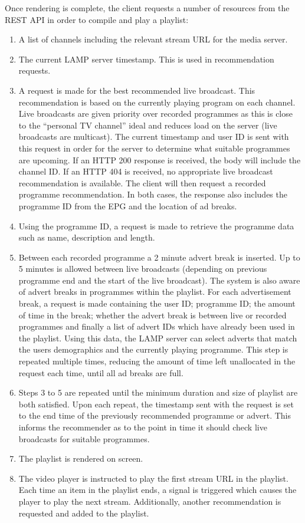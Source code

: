 Once rendering is complete, the client requests a number of resources from the REST API in order to compile and play a playlist:

\begin{enumerate}
	\item A list of channels including the relevant stream URL for the media server.
	\item The current LAMP server timestamp. This is used in recommendation requests.
	\item A request is made for the best recommended live broadcast. This recommendation is based on the currently playing program on each channel. Live broadcasts are given priority over recorded programmes as this is close to the ``personal TV channel'' ideal and reduces load on the server (live broadcasts are multicast). The current timestamp and user ID is sent with this request in order for the server to determine what suitable programmes are upcoming. If an HTTP 200 response is received, the body will include the channel ID. If an HTTP 404 is received, no appropriate live broadcast recommendation is available. The client will then request a recorded programme recommendation. In both cases, the response also includes the programme ID from the EPG and the location of ad breaks.
	\item Using the programme ID, a request is made to retrieve the programme data such as name, description and length.
	\item Between each recorded programme a 2 minute advert break is inserted. Up to 5 minutes is allowed between live broadcasts (depending on previous programme end and the start of the live broadcast). The system is also aware of advert breaks in programmes within the playlist. For each advertisement break, a request is made containing the user ID; programme ID; the amount of time in the break; whether the advert break is between live or recorded programmes and finally a list of advert IDs which have already been used in the playlist. Using this data, the LAMP server can select adverts that match the users demographics and the currently playing programme. This step is repeated multiple times, reducing the amount of time left unallocated in the request each time, until all ad breaks are full.
	\item Steps 3 to 5 are repeated until the minimum duration and size of playlist are both satisfied. Upon each repeat, the timestamp sent with the request is set to the end time of the previously recommended programme or advert. This informs the recommender as to the point in time it should check live broadcasts for suitable programmes.
	\item The playlist is rendered on screen.
	\item The video player is instructed to play the first stream URL in the playlist. Each time an item in the playlist ends, a signal is triggered which causes the player to play the next stream. Additionally, another recommendation is requested and added to the playlist.
\end{enumerate}

